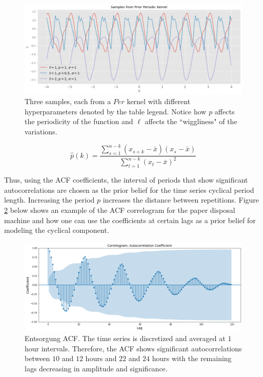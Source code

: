 \begin{figure}[htp]
\centering
\graphicspath{ {./images/} }
\includegraphics[scale=0.49]{images/samples_periodic_prior.png}
\caption{Three samples, each from a $Per$ kernel with different hyperparameters denoted by the table legend. Notice how $p$ affects the periodicity of the function and $\ell$ affects the ``wiggliness" of the variations.}
\label{fig:fig2}
\end{figure}

\begin{equation}
    \hat{p}(k) = \frac{\sum_{s=1}^{n-k}(x_{s+k} - \bar{x})(x_s - \bar{x})}{\sum_{t=1}^{n-k}(x_t - \bar{x})^2} 
\end{equation}

Thus, using the ACF coefficients, the interval of periods that show significant autocorrelations are chosen as the prior belief for the time series cyclical period length. Increasing the period $p$ increases the distance between repetitions. Figure \ref{fig:fig3} below shows an example of the ACF correlogram for the paper disposal machine and how one can use the coefficients at certain lags as a prior belief for modeling the cyclical component. 

\begin{figure}[htp]
\centering
\graphicspath{ {./images/} }
\includegraphics[scale=0.49]{images/entsorgung_acf.png}
\caption{Entsorgung ACF. The time series is discretized and averaged at $1$ hour intervals. Therefore, the ACF shows significant autocorrelations between $10$ and $12$ hours and $22$ and $24$ hours with the remaining lags decreasing in amplitude and significance.}
\label{fig:fig3}
\end{figure}

